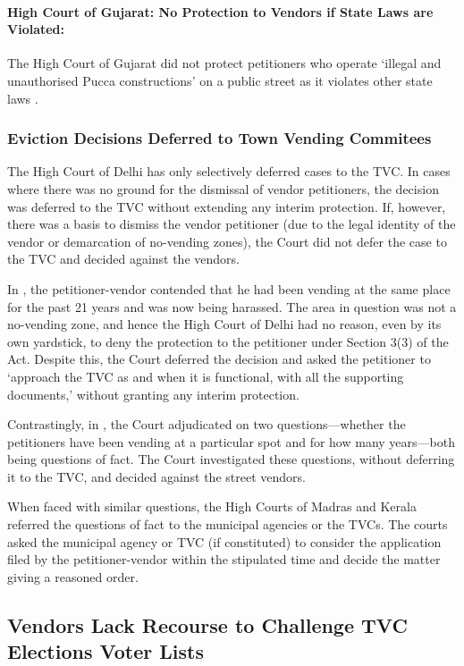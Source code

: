 \documentclass[a4paper, 12pt, twoside]{article}
\begin{document}
{\paragraph*{High Court of Gujarat: No Protection to Vendors if State Laws are Violated:}

The High Court of Gujarat did not protect petitioners who operate `illegal and unauthorised Pucca constructions' on a public street as it violates other state laws \parencite{VakatarSG}.

\subsubsection*{Eviction Decisions Deferred to Town Vending Commitees}

The High Court of Delhi has only selectively deferred cases to the TVC. In cases where there was no ground for the dismissal of vendor petitioners, the decision was deferred to the TVC without extending any interim protection. If, however, there was a basis to dismiss the vendor petitioner (due to the legal identity of the vendor or demarcation of no-vending zones), the Court did not defer the case to the TVC and decided against the vendors. 

In \cite{VKSahu}, the petitioner-vendor contended that he had been vending at the same place for the past 21 years and was now being harassed. The area in question was not a no-vending zone, and hence the High Court of Delhi had no reason, even by its own yardstick, to deny the protection to the petitioner under Section 3(3) of the Act. Despite this, the Court deferred the decision and asked the petitioner to `approach the TVC as and when it is functional, with all the supporting documents,' without granting any interim protection.

Contrastingly, in \cite{DwarkaS6}, the Court adjudicated on two questions—whether the petitioners have been vending at a particular spot and for how many years—both being questions of fact. The Court investigated these questions, without deferring it to the TVC, and decided against the street vendors. 

When faced with similar questions, the High Courts of Madras and Kerala referred the questions of fact to the municipal agencies or the TVCs. The courts asked the municipal agency or TVC (if constituted) to consider the application filed by the petitioner-vendor within the stipulated time and decide the matter giving a reasoned order.

\subsection*{Vendors Lack Recourse to Challenge TVC Elections Voter Lists}

}
\end{document}
